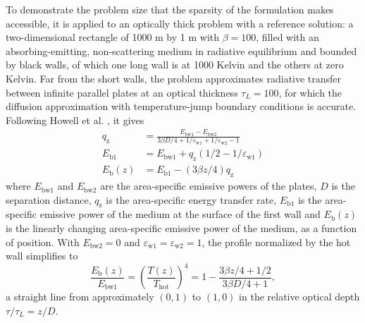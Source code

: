 \documentclass[preprint,1p,times]{elsarticle}
\theoremstyle{plain}
\theoremstyle{definition}
\theoremstyle{remark}
\begin{document}
To demonstrate the problem size that the sparsity of the formulation makes accessible, it is applied to an optically thick problem with a reference solution: a two-dimensional rectangle of 1000 m by 1 m with $\beta = 100$, filled with an absorbing-emitting, non-scattering medium in radiative equilibrium and bounded by black walls, of which one long wall is at 1000 Kelvin and the others at zero Kelvin. Far from the short walls, the problem approximates radiative transfer between infinite parallel plates at an optical thickness $\tau_L = 100$, for which the diffusion approximation with temperature-jump boundary conditions is accurate. Following Howell et al. \citep{Daun2021}, it gives
\begin{equation}
\begin{split}
	q_\mathrm{z} &= \frac{E_\mathrm{bw1}-E_\mathrm{bw2}}{3\beta D/4+1/\varepsilon_\mathrm{w1}+1/\varepsilon_\mathrm{w2}-1}\\
	E_\mathrm{b1} &= E_\mathrm{bw1} + q_\mathrm{z}(1/2 - 1/\varepsilon_\mathrm{w1})\\
	E_\mathrm{b}(z) &= E_\mathrm{b1} - (3\beta z/4) q_\mathrm{z}
\end{split}
\label{eq:diffusion_approx}
\end{equation}
where $E_\mathrm{bw1}$ and $E_\mathrm{bw2}$ are the area-specific emissive powers of the plates, $D$ is the separation distance, $q_\mathrm{z}$ is the area-specific energy transfer rate, $E_\mathrm{b1}$ is the area-specific emissive power of the medium at the surface of the first wall and $E_\mathrm{b}(z)$ is the linearly changing area-specific emissive power of the medium, as a function of position. With $E_\mathrm{bw2} = 0$ and $\varepsilon_\mathrm{w1}=\varepsilon_\mathrm{w2}=1$, the profile normalized by the hot wall simplifies to
\begin{equation}
	\frac{E_\mathrm{b}(z)}{E_\mathrm{bw1}} = \left(\frac{T(z)}{T_\mathrm{hot}}\right)^4 = 1 - \frac{3\beta z/4 + 1/2}{3\beta D/4+1},
	\label{eq:diffusion_simple}
\end{equation}
a straight line from approximately $(0,1)$ to $(1,0)$ in the relative optical depth $\tau/\tau_L = z/D$.
\end{document}
